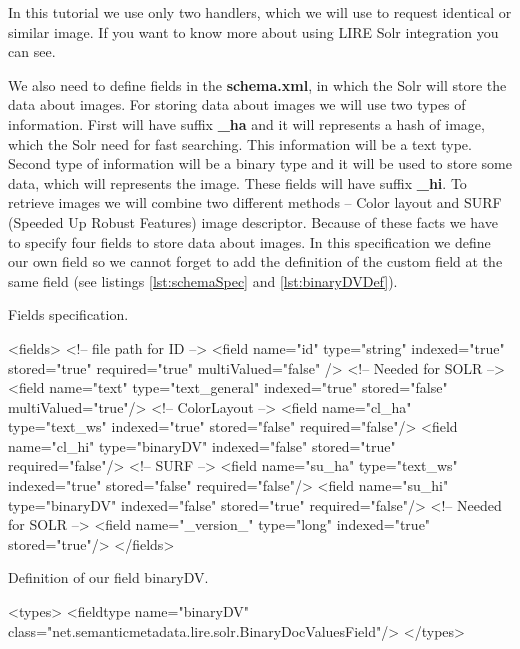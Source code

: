 \documentclass[12pt,a4paper]{report}
\begin{document}
In this tutorial we use only two handlers, which we will use to request identical or similar image. If you want to know more about using LIRE Solr integration you can see\cite{liresolr}.

We also need to define fields in the \textbf{schema.xml}, in which the Solr will store the data about images. For storing data about images we will use two types of information. First will have suffix \textbf{\_ha} and it will represents a hash of image, which the Solr need for fast searching. This information will be a text type. Second type of information will be a binary type and it will be used to store some data, which will represents the image. These fields will have suffix \textbf{\_hi}. To retrieve images we will combine two different methods -- Color layout and SURF (Speeded Up Robust Features) image descriptor. Because of these facts we have to specify four fields to store data about images. In this specification we define our own field so we cannot forget to add the definition of the custom field at the same field (see listings \ref{lst:schemaSpec} and \ref{lst:binaryDVDef}).

\begin{listing}[H]
\caption{Fields specification.}
\label{lst:schemaSpec}
\begin{xmlcode}
<fields>
   <!-- file path for ID -->
   <field name="id" type="string" indexed="true"
   stored="true" required="true" multiValued="false" />
   <!-- Needed for SOLR -->
   <field name="text" type="text_general" indexed="true"
   stored="false" multiValued="true"/>
   <!-- ColorLayout -->
   <field name="cl_ha" type="text_ws" indexed="true"
   stored="false" required="false"/>
   <field name="cl_hi" type="binaryDV"  indexed="false"
   stored="true" required="false"/>
   <!-- SURF -->
   <field name="su_ha" type="text_ws" indexed="true"
   stored="false" required="false"/>
   <field name="su_hi" type="binaryDV"  indexed="false"
   stored="true" required="false"/>
   <!-- Needed for SOLR -->
   <field name="\_version\_" type="long" indexed="true"
   stored="true"/>
</fields>
\end{xmlcode}
\end{listing}

\begin{listing}[H]
\caption{Definition of our field binaryDV.}
\label{lst:binaryDVDef}
\begin{xmlcode}
<types>
 <fieldtype name="binaryDV"
 class="net.semanticmetadata.lire.solr.BinaryDocValuesField"/>
</types>
\end{xmlcode}
\end{listing}
\end{document}

